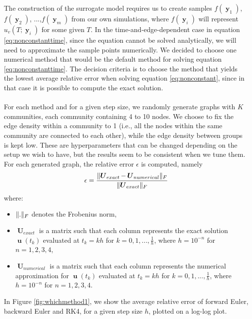 \documentclass[12pt, oneside]{report}   	%
\DeclarePairedDelimiter{\norm}{\lVert}{\rVert}        %
\DeclareMathOperator{\uu}{\boldsymbol{u}}
\DeclareMathOperator{\y}{\boldsymbol{y}}
\DeclareMathOperator{\UU}{\boldsymbol{U}}
\begin{document}
The construction of the surrogate model requires us to create samples $f(\y_1)$, $f(\y_2)$, ...,$f(\y_m)$ from our own simulations, where $f(\y_i)$ will represent $u_v(T;\y_i)$ for some given $T$. In the time-and-edge-dependent case in equation \eqref{eq:nonconstanttime}, since the equation cannot be solved analytically, we will need to approximate the sample points numerically. We decided to choose one numerical method that would be the default method for solving equation \eqref{eq:nonconstanttime}. The decision criteria is to choose the method that yields the lowest average relative error when solving equation \eqref{eq:nonconstant}, since in that case it is possible to compute the exact solution.\\\\
For each method and for a given step size, we randomly generate graphs with $K$ communities, each community containing 4 to 10 nodes. We choose to fix the edge density within a community to 1 (i.e., all the nodes within the same community are connected to each other), while the edge density between groups is kept low. These are hyperparameters that can be changed depending on the setup we wish to have, but the results seem to be consistent when we tune them. For each generated graph, the relative error $\epsilon$ is computed, namely
$$
\epsilon = \frac{\norm{\UU_{exact}-\UU_{numerical}}_F}{\norm{\UU_{exact}}_F}
$$
where:
\begin{itemize}
    \item $\norm{.}_F$ denotes the Frobenius norm,
    \item $\UU_{exact}$ is a matrix such that each column represents the exact solution $\uu(t_{k})$ evaluated at $t_k=kh$ for $k=0,1,...,\frac{1}{h}$, where $h=10^{-n}$ for $n=1,2,3,4$,
    \item $\UU_{numerical}$ is a matrix such that each column represents the numerical approximation for $\uu(t_{k})$ evaluated at $t_k=kh$ for $k=0,1,...,\frac{1}{h}$, where $h=10^{-n}$ for $n=1,2,3,4$.
\end{itemize}
In Figure \ref{fig:whichmethod1}, we show the average relative error of forward Euler, backward Euler and RK4, for a given step size $h$, plotted on a log-log plot. 
\end{document}
